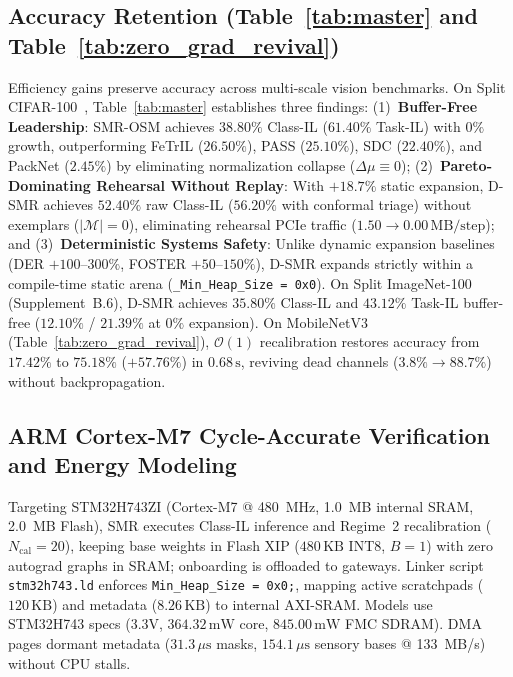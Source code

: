 \documentclass{article}
\begin{document}
\vspace{-2.0mm}
\subsection{Accuracy Retention (Table~\ref{tab:master} and Table~\ref{tab:zero_grad_revival})}
Efficiency gains preserve accuracy across multi-scale vision benchmarks. On Split CIFAR-100~\cite{krizhevsky2009learning}, Table~\ref{tab:master} establishes three findings: (1)~\textbf{Buffer-Free Leadership}: SMR-OSM achieves $\mathbf{38.80\%}$ Class-IL ($61.40\%$ Task-IL) with $0\%$ growth, outperforming FeTrIL ($26.50\%$), PASS ($25.10\%$), SDC ($22.40\%$), and PackNet ($2.45\%$) by eliminating normalization collapse ($\Delta\mu \equiv 0$); (2)~\textbf{Pareto-Dominating Rehearsal Without Replay}: With $+18.7\%$ static expansion, D-SMR achieves $52.40\%$ raw Class-IL ($56.20\%$ with conformal triage) without exemplars ($|\mathcal{M}|=0$), eliminating rehearsal PCIe traffic ($1.50 \to 0.00\,\text{MB/step}$); and (3)~\textbf{Deterministic Systems Safety}: Unlike dynamic expansion baselines (DER $+100\text{--}300\%$, FOSTER $+50\text{--}150\%$), D-SMR expands strictly within a compile-time static arena (\texttt{\_Min\_Heap\_Size = 0x0}). On Split ImageNet-100~\cite{deng2009imagenet} (Supplement~B.6), D-SMR achieves $35.80\%$ Class-IL and $43.12\%$ Task-IL buffer-free ($12.10\%$ / $21.39\%$ at $0\%$ expansion). On MobileNetV3~\cite{howard2019searching} (Table~\ref{tab:zero_grad_revival}), $\mathcal{O}(1)$ recalibration restores accuracy from $17.42\%$ to $75.18\%$ ($+57.76\%$) in $0.68\,\text{s}$, reviving dead channels ($3.8\% \to 88.7\%$) without backpropagation.

\vspace{-2.0mm}
\subsection{ARM Cortex-M7 Cycle-Accurate Verification and Energy Modeling}
\label{sec:mcu_eval}
Targeting STM32H743ZI (Cortex-M7 @ 480~MHz, 1.0~MB internal SRAM, 2.0~MB Flash), SMR executes Class-IL inference and Regime~2 recalibration ($N_{\mathrm{cal}}=20$), keeping base weights in Flash XIP ($480\,\text{KB}$ INT8, $B=1$) with zero autograd graphs in SRAM; onboarding is offloaded to gateways. Linker script \texttt{stm32h743.ld} enforces \texttt{Min\_Heap\_Size = 0x0;}, mapping active scratchpads ($120\,\text{KB}$) and metadata ($8.26\,\text{KB}$) to internal AXI-SRAM. Models use STM32H743 specs (3.3V, $364.32\,\text{mW}$ core, $845.00\,\text{mW}$ FMC SDRAM). DMA pages dormant metadata ($31.3\,\mu\text{s}$ masks, $154.1\,\mu\text{s}$ sensory bases @ 133~MB/s) without CPU stalls.
\end{document}
